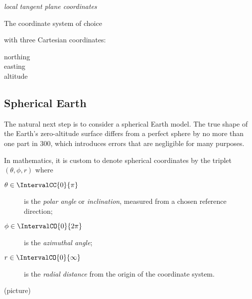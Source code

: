      \emph{local tangent plane coordinates}

     The coordinate system of choice

    with three Cartesian coordinates:
     \begin{description}
         \item[northing]
         \item[easting]
         \item[altitude]
     \end{description}



    \subsection{Spherical Earth} \label{mms}
        The natural next step is to consider a spherical Earth model.
        The true shape of the Earth's zero-altitude surface differs from
        a perfect sphere by no more than one part in 300, which introduces errors
        that are negligible for many purposes.

        In mathematics, it is custom to denote spherical coordinates by the triplet $(\theta, \phi, r)$
        where
        \begin{description}
            \item[$\theta \in \IntervalCC{0}{\pi}$] is the \emph{polar angle} or \emph{inclination},
                measured from a chosen reference direction;
            \item[$\phi \in \IntervalCO{0}{2\pi}$] is the \emph{azimuthal angle};
            \item[$r \in \IntervalCO{0}{\infty}$] is the \emph{radial distance} from the origin of the coordinate system.
        \end{description}

        (picture)

